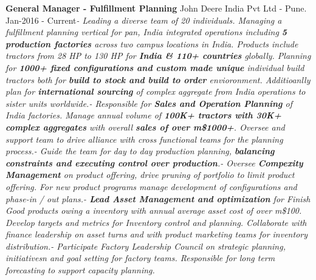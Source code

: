 \documentclass[11pt, a4paper]{awesome-cv}
\begin{document}
\textbf{General Manager - Fulfillment Planning} \hfill John Deere India
Pvt Ltd - Pune\newline . \hfill Jan-2016 -
Current\newline \textit{- \hspace{5mm}  Leading a diverse team of 20 individuals. Managing a fulfillment planning vertical for pan, India integrated operations including \textbf{5 production factories} across two campus locations in India. Products include tractors from 28 HP to 130 HP for \textbf{India \& 110+ countries} globally. Planning for \textbf{1000+ fixed configurations and custom made unique} individual build tractors both for \textbf{build to stock and build to order} envioronment. Additioanlly plan for \textbf{international sourcing} of complex aggregate from India operations to sister units worldwide.\newline - \hspace{5mm}  Responsible  for \textbf{Sales and Operation Planning} of India factories.  Manage annual volume of \textbf{100K+ tractors with 30K+ complex aggregates} with overall \textbf{sales of over m\$1000+}. Oversee and support team to drive alliance with cross functional teams for the planning process.\newline - \hspace{5mm}  Guide the team for day to day production planning,  \textbf{balancing constraints and executing control over production}.\newline - \hspace{5mm}  Oversee \textbf{Compexity Management} on product offering, drive pruning of portfolio to limit product offering. For new product programs manage development of configurations and phase-in / out plans.\newline - \hspace{5mm}  \newpage \textbf{Lead Asset Management and optimization} for Finish Good products owing a inventory with annual average asset cost of over m\$100. Develop targets and metrics for Inventory control and planning. Collaborate with finance leadership on asset turns and with product marketing teams for inventory distribution.\newline - \hspace{5mm}  Participate Factory Leadership Council on strategic planning, initiativesn and goal setting for factory teams. Responsible for  long term forecasting to support capacity planning.}
\newline \vspace{2mm} \newline
\end{document}

